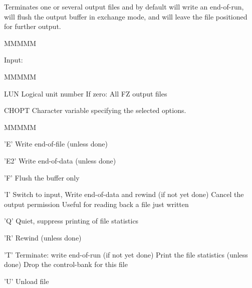 \par Terminates one or several output files and by default
will write an end-of-run, will flush the output buffer in
exchange mode, and will leave the file positioned for further output.
\begin{DL}{MMMMM}
\item[Input:
]
\begin{DL}{MMMMM}
\item[LUN
]Logical unit number
\newline If zero: All FZ output files
\item[CHOPT
]Character variable specifying the selected options.
\begin{DL}{MMMMM}
\item['E'
]Write end-of-file (unless done)
\item['E2'
]Write end-of-data (unless done)
\item['F'
]Flush the buffer only
\item['I'
]Switch to input,
\newline Write end-of-data and rewind (if not yet done)
\newline Cancel the output permission
\newline Useful for reading back a file just written
\item['Q'
]Quiet, suppress printing of file statistics
\item['R'
]Rewind (unless done)
\item['T'
]Terminate: write end-of-run (if not yet done)
\newline Print the file statistics (unless done)
\newline Drop the control-bank for this file
\item['U'
]Unload file
\end{DL}
\end{DL}
\end{DL}
